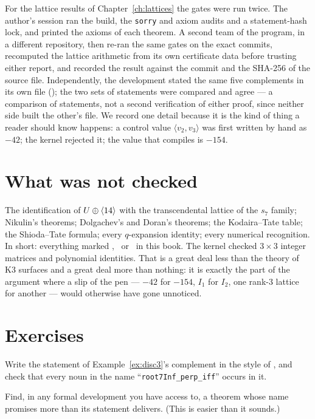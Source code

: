 For the lattice results of Chapter~\ref{ch:lattices} the gates were run twice.
The author's session ran the build, the \texttt{sorry} and axiom audits and a
statement-hash lock, and printed the axioms of each theorem. A second team of
the program, in a different repository, then re-ran the same gates on the exact
commits, recomputed the lattice arithmetic from its own certificate data
before trusting either report, and recorded the result against the commit and
the SHA-256 of the source file. Independently, the development
\cite{LeanMaster2026} stated the same five complements in its own file
(); the two sets of statements were
compared and agree --- a comparison of statements, not a second verification of
either proof, since neither side built the other's file. We record one detail
because it is the kind of thing a reader should know happens: a control value
$\langle v_2,v_3\rangle$ was first written by hand as $-42$; the kernel
rejected it; the value that compiles is $-154$.

\section{What was not checked}

The identification of $U\oplus\langle 14\rangle$ with the transcendental lattice of
the $s_7$ family; Nikulin's theorems; Dolgachev's and Doran's theorems; the
Kodaira--Tate table; the Shioda--Tate formula; every $q$-expansion identity;
every numerical recognition. In short: everything marked \Lstatus, \Estatus\ or
\Nstatus\ in this book. The kernel checked $3\times3$ integer matrices and
polynomial identities. That is a great deal less than the theory of K3
surfaces and a great deal more than nothing: it is exactly the part of the
argument where a slip of the pen --- $-42$ for $-154$, $I_1$ for $I_2$, one
rank-3 lattice for another --- would otherwise have gone unnoticed.

\section{Exercises}

\begin{exercise}
Write the statement of Example~\ref{ex:disc3}'s complement in the style of
, and check that every noun in the name
``\texttt{root7Inf\_perp\_iff}'' occurs in it.
\end{exercise}

\begin{exercise}
Find, in any formal development you have access to, a theorem whose name
promises more than its statement delivers. (This is easier than it sounds.)
\end{exercise}

